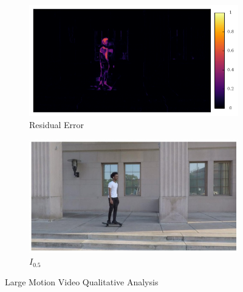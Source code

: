 \documentclass{article}
\begin{document}
\begin{figure}
\begin{subfigure}{0.33\textwidth}
	\centering
    \includegraphics[width=1\linewidth]{nd_scene/Skating_error.png}
    \caption{Residual Error}
\end{subfigure}%
\begin{subfigure}{0.33\textwidth}
	\centering
    \includegraphics[width=1\linewidth]{nd_scene/Skating_GT.jpg}
    \caption{$I_{0.5}$}
\end{subfigure}
\caption{Large Motion Video Qualitative Analysis}
\end{figure}
\end{document}

